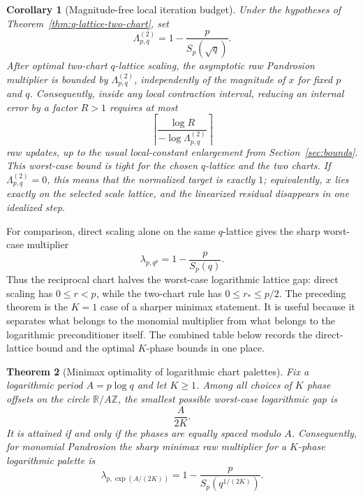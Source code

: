 \documentclass[10pt,a4paper]{article}
\theoremstyle{plain}
\newtheorem{theorem}{Theorem}[section]
\newtheorem{corollary}[theorem]{Corollary}
\theoremstyle{definition}
\theoremstyle{remark}
\newcommand{\R}{\mathbb{R}}
\begin{document}
\begin{corollary}[Magnitude-free local iteration budget]
\label{cor:q-lattice-complexity}
Under the hypotheses of Theorem~\ref{thm:q-lattice-two-chart}, set
\[
  \Lambda_{p,q}^{(2)}=1-\frac{p}{S_p(\sqrt q)}.
\]
After optimal two-chart $q$-lattice scaling, the asymptotic raw Pandrosion
multiplier is bounded by $\Lambda_{p,q}^{(2)}$, independently of the magnitude
of $x$ for fixed $p$ and $q$.  Consequently, inside any local contraction
interval, reducing an internal error by a factor $R>1$ requires at most
\[
  \left\lceil \frac{\log R}{-\log \Lambda_{p,q}^{(2)}}\right\rceil
\]
raw updates, up to the usual local-constant enlargement from
Section~\ref{sec:bounds}.  This worst-case bound is tight for the chosen
$q$-lattice and the two charts.  If $\Lambda_{p,q}^{(2)}=0$, this means that the
normalized target is exactly $1$; equivalently, $x$ lies exactly on the selected
scale lattice, and the linearized residual disappears in one idealized step.
\end{corollary}

For comparison, direct scaling alone on the same $q$-lattice gives the sharp
worst-case multiplier
\[
  \lambda_{p,q^p}=1-\frac{p}{S_p(q)}.
\]
Thus the reciprocal chart halves the worst-case logarithmic lattice gap: direct
scaling has $0\le r<p$, while the two-chart rule has $0\le r_*\le p/2$.
The preceding theorem is the $K=1$ case of a sharper minimax statement.  It is
useful because it separates what belongs to the monomial multiplier from what
belongs to the logarithmic preconditioner itself.  The combined table below
records the direct-lattice bound and the optimal $K$-phase bounds in one place.


\begin{theorem}[Minimax optimality of logarithmic chart palettes]
\label{thm:minimax-palette}
Fix a logarithmic period $A=p\log q$ and let $K\ge1$.  Among all choices of
$K$ phase offsets on the circle $\R/A\mathbb Z$, the smallest possible
worst-case logarithmic gap is
\[
  \frac{A}{2K}.
\]
It is attained if and only if the phases are equally spaced modulo $A$.
Consequently, for monomial Pandrosion the sharp minimax raw multiplier for a
$K$-phase logarithmic palette is
\begin{equation}
  \lambda_{p,\exp(A/(2K))}
  =1-\frac{p}{S_p(q^{1/(2K)})}.
  \label{eq:K-palette-bound}
\end{equation}
\end{theorem}
\end{document}
